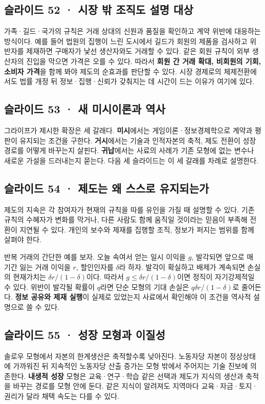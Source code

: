 \documentclass[10pt,a4paper]{article}
\begin{document}
\subsection{슬라이드 52 · 시장 밖 조직도 설명 대상}
가족·길드·국가의 규칙은 거래 상대의 신원과 품질을 확인하고 계약 위반에 대응하는 방식이다. 예를 들어 법원의 집행이 느린 도시에서 길드가 회원의 제품을 검사하고 위반자를 제재하면 구매자가 낯선 생산자와도 거래할 수 있다. 같은 회원 규칙이 외부 생산자의 진입을 막으면 가격은 오를 수 있다. 따라서 \textbf{회원 간 거래 확대, 비회원의 기회, 소비자 가격}을 함께 봐야 제도의 순효과를 판단할 수 있다. 시장 경제로의 체제전환에서도 법률 개정 뒤 정보·집행·신뢰가 갖춰지는 데 시간이 드는 이유가 여기에 있다.\par

\subsection{슬라이드 53 · 새 미시이론과 역사}
그라이프가 제시한 확장은 세 갈래다. \textbf{미시}에서는 게임이론·정보경제학으로 계약과 평판이 유지되는 조건을 구한다. \textbf{거시}에서는 기술과 인적자본의 축적, 제도 전환이 성장 경로를 어떻게 바꾸는지 살핀다. \textbf{귀납}에서는 사료의 사례가 기존 모형에 없는 변수나 새로운 가설을 드러내는지 묻는다. 다음 세 슬라이드는 이 세 갈래를 차례로 설명한다.\par

\subsection{슬라이드 54 · 제도는 왜 스스로 유지되는가}
제도의 지속은 각 참여자가 현재의 규칙을 따를 유인을 가질 때 설명할 수 있다. 기존 규칙의 수혜자가 변화를 막거나, 다른 사람도 함께 움직일 것이라는 믿음이 부족해 전환이 지연될 수 있다. 개인의 보수와 제재를 집행할 조직, 정보가 퍼지는 범위를 함께 살펴야 한다.\par

반복 거래의 간단한 예를 보자. 오늘 속여서 얻는 일시 이익을 $g$, 발각되면 앞으로 매 기간 잃는 거래 이익을 $r$, 할인인자를 $\delta$라 하자. 발각이 확실하고 배제가 계속되면 손실의 현재가치는 $\delta r/(1-\delta)$이다. 따라서 $g\leq\delta r/(1-\delta)$이면 정직이 자기강제적일 수 있다. 위반이 발각될 확률이 $q$라면 단순 모형의 기대 손실은 $q\delta r/(1-\delta)$로 줄어든다. \textbf{정보 공유와 제재 실행}이 실제로 있었는지 사료에서 확인해야 이 조건을 역사적 설명으로 쓸 수 있다.\par

\subsection{슬라이드 55 · 성장 모형과 이질성}
솔로우 모형에서 자본의 한계생산은 축적할수록 낮아진다. 노동자당 자본이 정상상태에 가까워진 뒤 지속적인 노동자당 산출 증가는 모형 밖에서 주어지는 기술 진보에 의존한다. \textbf{내생적 성장} 모형은 교육·연구·학습 같은 선택과 제도가 지식의 생산과 축적을 바꾸는 경로를 모형 안에 둔다. 같은 지식이 알려져도 지역마다 교육·자금·토지·권리가 달라 채택 속도는 다를 수 있다.\par
\end{document}
